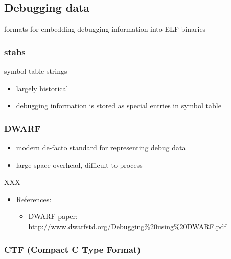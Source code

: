 \subsection{Debugging data}

formats for embedding debugging information into ELF binaries

\subsubsection{stabs}

symbol table strings

\begin{itemize}
\item largely historical
\item debugging information is stored as special entries in symbol table
\end{itemize}

\subsubsection{DWARF}

\begin{itemize}
\item modern de-facto standard for representing debug data
\item large space overhead, difficult to process
\end{itemize}

XXX

\begin{itemize}
\item References:
  \begin{itemize}
  \item DWARF paper:
     \url{http://www.dwarfstd.org/Debugging\%20using\%20DWARF.pdf}
  \end{itemize}
\end{itemize}


\subsubsection{CTF (Compact C Type Format)}

